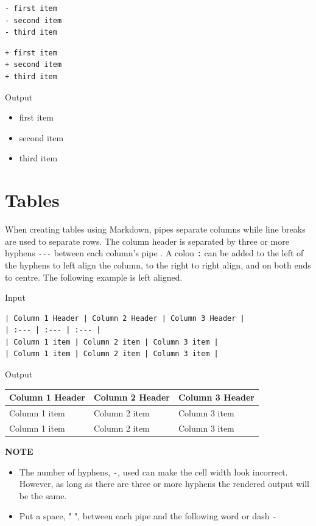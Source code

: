 \documentclass[
]{book}
\providecommand{\tightlist}{%
  \setlength{\itemsep}{0pt}\setlength{\parskip}{0pt}}
\begin{document}
\begin{verbatim}
- first item
- second item
- third item
\end{verbatim}

\begin{verbatim}
+ first item
+ second item
+ third item 
\end{verbatim}

Output

\begin{itemize}
\tightlist
\item
  first item
\item
  second item
\item
  third item
\end{itemize}

\hypertarget{tables-1}{%
\section{Tables}\label{tables-1}}

When creating tables using Markdown, pipes \texttt{\textbar{}} separate columns while line breaks are used to separate rows. The column header is separated by three or more hyphens \texttt{-\/-\/-} between each column's pipe \texttt{\textbar{}}. A colon \texttt{:} can be added to the left of the hyphens to left align the column, to the right to right align, and on both ends to centre. The following example is left aligned.

Input

\begin{verbatim}
| Column 1 Header | Column 2 Header | Column 3 Header |
| :--- | :--- | :--- |
| Column 1 item | Column 2 item | Column 3 item |
| Column 1 item | Column 2 item | Column 3 item |
\end{verbatim}

Output

\begin{longtable}[]{@{}lll@{}}
\toprule
Column 1 Header & Column 2 Header & Column 3 Header \\
\midrule
\endhead
Column 1 item & Column 2 item & Column 3 item \\
Column 1 item & Column 2 item & Column 3 item \\
\bottomrule
\end{longtable}

\textbf{NOTE}

\begin{itemize}
\tightlist
\item
  The number of hyphens, \texttt{-}, used can make the cell width look incorrect. However, as long as there are three or more hyphens the rendered output will be the same.
\item
  Put a space, " ", between each pipe \texttt{\textbar{}} and the following word or dash \texttt{-}
\end{itemize}
\end{document}
